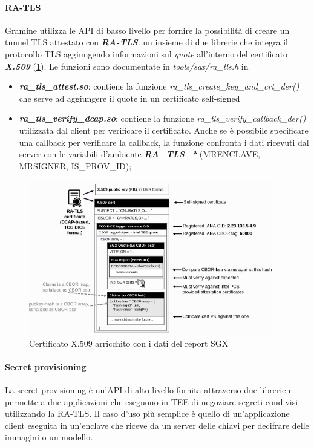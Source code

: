 \documentclass{article}
\begin{document}
\paragraph{RA-TLS}
Gramine utilizza le API di basso livello per fornire la possibilità di creare un tunnel TLS attestato con \textbf{\textit{RA-TLS}}: un insieme di due librerie che integra il protocollo TLS aggiungendo informazioni sul \textit{quote} all'interno del certificato \textbf{\textit{X.509}} (\cref{fig:ra-tls-certificate}). Le funzioni sono documentate in \textit{tools/sgx/ra\_tls.h} in \cite{gramine-repo}
\begin{itemize}
  \item \textbf{\textit{ra\_tls\_attest.so}}: contiene la funzione \textit{ra\_tls\_create\_key\_and\_crt\_der()} che serve ad aggiungere il quote in un certificato self-signed
  \item \textbf{\textit{ra\_tls\_verify\_dcap.so}}: contiene la funzione \textit{ra\_tls\_verify\_callback\_der()} utilizzata dal client per verificare il certificato. Anche se è possibile specificare una callback per verificare la callback, la funzione confronta i dati ricevuti dal server con le variabili d'ambiente \textbf{\textit{RA\_TLS\_*}} (MRENCLAVE, MRSIGNER, IS\_PROV\_ID);
\end{itemize}

\begin{figure}
  \begin{center}
    \includegraphics[width=0.95\textwidth]{figures/ch3/ra-tls-certificate.png}
  \end{center}
  \caption{Certificato X.509 arricchito con i dati del report SGX}\label{fig:ra-tls-certificate}
\end{figure}


\paragraph{Secret provisioning}
La secret provisioning è un'API di alto livello fornita attraverso due librerie e permette a due applicazioni che eseguono in TEE di negoziare segreti condivisi utilizzando la RA-TLS. Il caso d'uso più semplice è quello di un'applicazione client eseguita in un'enclave che riceve da un server delle chiavi per decifrare delle immagini o un modello. 
\end{document}
